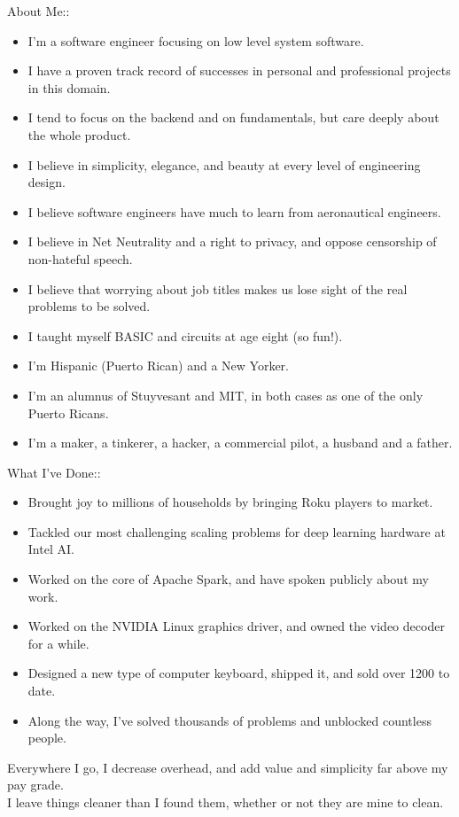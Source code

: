 \documentclass{letter}
\begin{document}
\thispagestyle{empty}
About Me::

\begin{itemize}
\item I'm a software engineer focusing on low level system software.
\item I have a proven track record of successes in personal and professional projects in this domain.
\item I tend to focus on the backend and on fundamentals, but care deeply about the whole product.
\item I believe in simplicity, elegance, and beauty at every level of engineering design.
\item I believe software engineers have much to learn from aeronautical engineers.
\item I believe in Net Neutrality and a right to privacy, and oppose censorship of non-hateful speech.
\item I believe that worrying about job titles makes us lose sight of the real problems to be solved.
\item I taught myself BASIC and circuits at age eight (so fun!).
\item I'm Hispanic (Puerto Rican) and a New Yorker.
\item I'm an alumnus of Stuyvesant and MIT, in both cases as one of the only Puerto Ricans.
\item I'm a maker, a tinkerer, a hacker, a commercial pilot, a husband and a father.
\end{itemize}

What I've Done::

\begin{itemize}
\item Brought joy to millions of households by bringing Roku players to market.
\item Tackled our most challenging scaling problems for deep learning hardware at Intel AI.
\item Worked on the core of Apache Spark, and have spoken publicly about my work.
\item Worked on the NVIDIA Linux graphics driver, and owned the video decoder for a while.
\item Designed a new type of computer keyboard, shipped it, and sold over 1200 to date.
\item Along the way, I've solved thousands of problems and unblocked countless people.
\end{itemize}

Everywhere I go, I decrease overhead, and add value and simplicity far above my pay grade.\\
I leave things cleaner than I found them, whether or not they are mine to clean.
\end{document}
